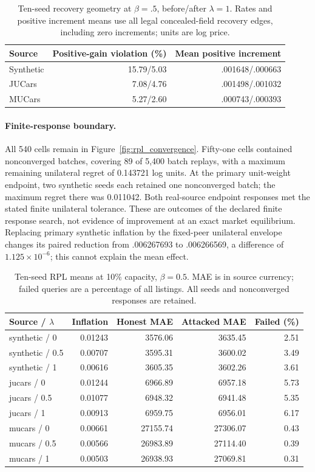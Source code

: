 \documentclass[11pt]{article}
\begin{document}
\begin{table}[htbp]\centering\small
\caption{Ten-seed recovery geometry at $\beta=.5$, before/after $\lambda=1$.
Rates and positive increment means use all legal concealed-field recovery
edges, including zero increments; units are log price.}
\label{tab:ten_seed_mechanism}
\begin{tabular}{lrr}\toprule
Source & Positive-gain violation (\%) & Mean positive increment\\\midrule
Synthetic & 15.79/5.03 & .001648/.000663\\
JUCars & 7.08/4.76 & .001498/.001032\\
MUCars & 5.27/2.60 & .000743/.000393\\
\bottomrule\end{tabular}
\end{table}

\paragraph{Finite-response boundary.}
All 540 cells remain in Figure~\ref{fig:rpl_convergence}. Fifty-one cells
contained nonconverged batches, covering 89 of 5,400 batch replays, with a
maximum remaining unilateral regret of 0.143721 log units. At the primary
unit-weight endpoint, two synthetic seeds each retained one nonconverged batch;
the maximum regret there was 0.011042. Both real-source endpoint responses
met the stated finite unilateral tolerance. These are outcomes of the declared
finite response search, not evidence of improvement at an exact market
equilibrium. Replacing primary synthetic inflation by the fixed-peer unilateral envelope changes its paired reduction from .006267693 to .006266569, a difference of $1.125\times10^{-6}$; this cannot explain the mean effect.

\begin{table}[tbp]\centering\small
\caption{Ten-seed RPL means at 10\% capacity, $\beta=0.5$. MAE is in source
currency; failed queries are a percentage of all listings. All seeds and
nonconverged responses are retained.}\label{tab:rpl_primary}
\begin{tabular}{lrrrr}\toprule
Source / $\lambda$ & Inflation & Honest MAE & Attacked MAE & Failed (\%)\\\midrule
synthetic / 0 & 0.01243 & 3576.06 & 3635.45 & 2.51 \\
synthetic / 0.5 & 0.00707 & 3595.31 & 3600.02 & 3.49 \\
synthetic / 1 & 0.00616 & 3605.35 & 3602.26 & 3.61 \\
jucars / 0 & 0.01244 & 6966.89 & 6957.18 & 5.73 \\
jucars / 0.5 & 0.01077 & 6948.32 & 6941.48 & 5.35 \\
jucars / 1 & 0.00913 & 6959.75 & 6956.01 & 6.17 \\
mucars / 0 & 0.00661 & 27155.74 & 27306.07 & 0.43 \\
mucars / 0.5 & 0.00566 & 26983.89 & 27114.40 & 0.39 \\
mucars / 1 & 0.00503 & 26938.93 & 27069.81 & 0.31 \\
\bottomrule\end{tabular}\end{table}
\end{document}
